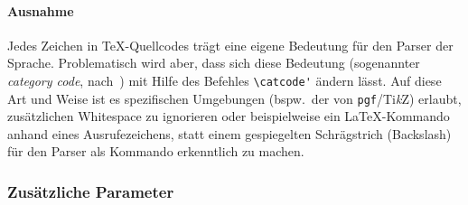 \paragraph{Ausnahme}\par
Jedes Zeichen in \TeX{}-Quellcodes trägt eine eigene Bedeutung für den Parser der Sprache. Problematisch wird aber, dass sich diese Bedeutung (sogenannter \textit{category code}, nach~\cite[Appendix D, Seite 371]{texbook}) mit Hilfe des Befehles \verb/\catcode'/ ändern lässt. Auf diese Art und Weise ist es spezifischen Umgebungen (bspw.\ der von \texttt{pgf}/Ti\textit{k}Z) erlaubt, zusätzlichen Whitespace zu ignorieren oder beispielweise ein \LaTeX{}-Kommando anhand eines Ausrufezeichens, statt einem gespiegelten Schrägstrich (Backslash) für den Parser als Kommando erkenntlich zu machen.%
\begin{comment}
{\catcode'\=9\relax \catcode'!=0 0LaTeX} wurde mit einem Ausrufezeichen produziert. \LaTeX{} hingegen nicht. Category Codes erlauben beispielsweise auch die Nutzung eines Hashtags innerhalb eines {\catcode'#=11 #Satzes}.
\end{comment}








\subsubsection{Zusätzliche Parameter}
